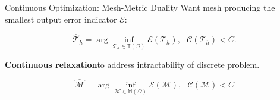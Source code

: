 \documentclass{beamer}
\newcounter{sectionframes}
\newcommand{\setsectionframes}[1]{%
  \setcounter{sectionframes}{#1}%
}
\newcounter{sectionframecount}
\begin{document}
\setsectionframes{3}



\begin{frame}[t]{Continuous Optimization: Mesh-Metric Duality}
\vspace{-10pt}
Want mesh producing the smallest output error indicator $\mathcal{E}$:

\begin{equation}
  \hat{\mathcal{T}}_h = \arg \inf_{\mathcal{T}_h \in \mathbb{T}(\Omega)} \mathcal{E}(\mathcal{T}_h),~~~\mathcal{C}(\mathcal{T}_h) < C.
\end{equation}

{
\textbf{Continuous relaxation}\footnotemark to address intractability of discrete problem.

\begin{equation}
  \hat{\mathcal{M}} = \arg\inf_{\mathcal{M} \in \mathbb{M}(\Omega)} \mathcal{E}(\mathcal{M}),~~~\mathcal{C}(\mathcal{M}) < C
\end{equation}

}

\end{frame}

\end{document}

